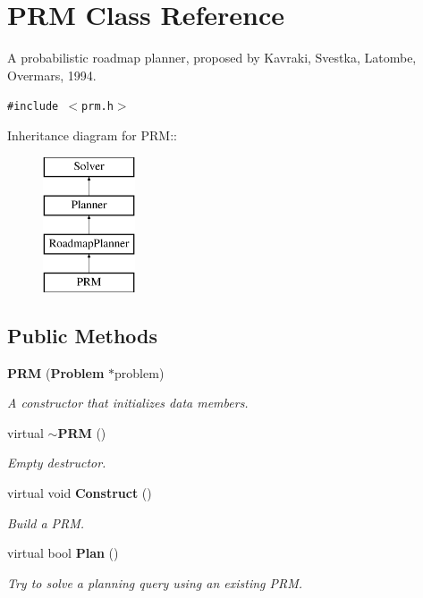 \section{PRM  Class Reference}
\label{classPRM}
A probabilistic roadmap planner, proposed by Kavraki, Svestka, Latombe, Overmars, 1994. 


{\tt \#include $<$prm.h$>$}

Inheritance diagram for PRM::\begin{figure}[H]
\begin{center}
\leavevmode
\includegraphics[height=4cm]{classPRM}
\end{center}
\end{figure}
\subsection*{Public Methods}
\begin{CompactItemize}
\item 
{\bf PRM} ({\bf Problem} $\ast$problem)
\begin{CompactList}\small\item\em A constructor that initializes data members.\item\end{CompactList}\item 
virtual {\bf $\sim$PRM} ()
\begin{CompactList}\small\item\em Empty destructor.\item\end{CompactList}\item 
virtual void {\bf Construct} ()
\begin{CompactList}\small\item\em Build a PRM.\item\end{CompactList}\item 
virtual bool {\bf Plan} ()
\begin{CompactList}\small\item\em Try to solve a planning query using an existing PRM.\item\end{CompactList}\end{CompactItemize}
